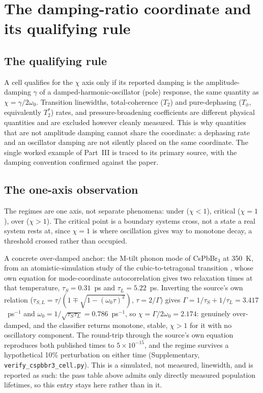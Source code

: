 \section{The damping-ratio coordinate and its qualifying rule}

\subsection{The qualifying rule}

A cell qualifies for the \(\chi\) axis only if its reported damping is the amplitude-damping \(\gamma\) of a damped-harmonic-oscillator (pole) response, the same quantity as \(\chi = \gamma/2\omega_0\). Transition linewidths, total-coherence (\(T_2\)) and pure-dephasing (\(T_\phi\), equivalently \(T_2^*\)) rates, and pressure-broadening coefficients are different physical quantities and are excluded however cleanly measured. This is why quantities that are not amplitude damping cannot share the coordinate: a dephasing rate and an oscillator damping are not silently placed on the same coordinate. The single worked example of Part~III is traced to its primary source, with the damping convention confirmed against the paper.

\subsection{The one-axis observation}

The regimes are one axis, not separate phenomena: under (\(\chi<1\)), critical (\(\chi=1\)), over (\(\chi>1\)). The critical point is a boundary systems cross, not a state a real system rests at, since \(\chi=1\) is where oscillation gives way to monotone decay, a threshold crossed rather than occupied.

A concrete over-damped anchor: the M-tilt phonon mode of CsPbBr\(_3\) at 350~K, from an atomistic-simulation study of the cubic-to-tetragonal transition \citep{fransson}, whose own equation for mode-coordinate autocorrelation gives two relaxation times at that temperature, \(\tau_S=0.31\)~ps and \(\tau_L=5.22\)~ps. Inverting the source's own relation (\(\tau_{S,L} = \tau/(1\mp\sqrt{1-(\omega_0\tau)^2})\), \(\tau=2/\Gamma\)) gives \(\Gamma = 1/\tau_S+1/\tau_L = 3.417\)~ps\(^{-1}\) and \(\omega_0 = 1/\sqrt{\tau_S\tau_L} = 0.786\)~ps\(^{-1}\), so \(\chi=\Gamma/2\omega_0=2.174\): genuinely over-damped, and the classifier returns monotone, stable, \(\chi>1\) for it with no oscillatory component. The round-trip through the source's own equation reproduces both published times to \(5\times10^{-15}\), and the regime survives a hypothetical 10\% perturbation on either time (Supplementary, \texttt{verify\_cspbbr3\_cell.py}). This is a simulated, not measured, linewidth, and is reported as such: the pass table above admits only directly measured population lifetimes, so this entry stays here rather than in it.

